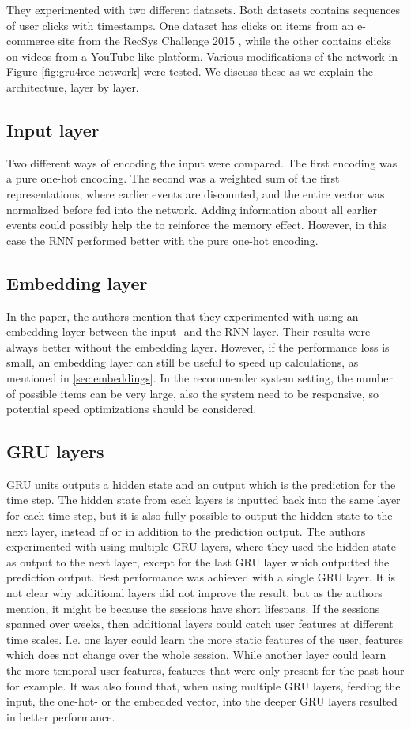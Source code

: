 They experimented with two different datasets. Both datasets contains sequences of user clicks with timestamps. One dataset has clicks on items from an e-commerce site from the RecSys Challenge 2015 \cite{dataset:recsys15}, while the other contains clicks on videos from a YouTube-like platform. Various modifications of the network in Figure \ref{fig:gru4rec-network} were tested. We discuss these as we explain the architecture, layer by layer.

\subsection{Input layer}
Two different ways of encoding the input were compared. The first encoding was a pure one-hot encoding. The second was a weighted sum of the first representations, where earlier events are discounted, and the entire vector was normalized before fed into the network. Adding information about all earlier events could possibly help the to reinforce the memory effect. However, in this case the RNN performed better with the pure one-hot encoding. 

\subsection{Embedding layer}
In the paper, the authors mention that they experimented with using an embedding layer between the input- and the RNN layer. Their results were always better without the embedding layer. However, if the performance loss is small, an embedding layer can still be useful to speed up calculations, as mentioned in \ref{sec:embeddings}. In the recommender system setting, the number of possible items can be very large, also the system need to be responsive, so potential speed optimizations should be considered.

\subsection{GRU layers}
GRU units outputs a hidden state and an output which is the prediction for the time step. The hidden state from each layers is inputted back into the same layer for each time step, but it is also fully possible to output the hidden state to the next layer, instead of or in addition to the prediction output. The authors experimented with using multiple GRU layers, where they used the hidden state as output to the next layer, except for the last GRU layer which outputted the prediction output. Best performance was achieved with a single GRU layer. It is not clear why additional layers did not improve the result, but as the authors mention, it might be because the sessions have short lifespans. If the sessions spanned over weeks, then additional layers could catch user features at different time scales. I.e. one layer could learn the more static features of the user, features which does not change over the whole session. While another layer could learn the more temporal user features, features that were only present for the past hour for example. It was also found that, when using multiple GRU layers, feeding the input, the one-hot- or the embedded vector, into the deeper GRU layers resulted in better performance.

